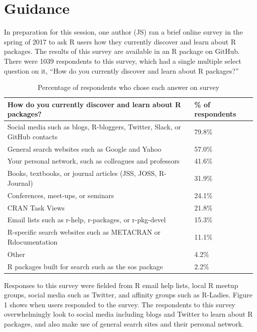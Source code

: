 \hypertarget{guidance}{%
\section{Guidance}\label{guidance}}

In preparation for this session, one author (JS) ran a brief online
survey in the spring of 2017 to ask R users how they currently discover
and learn about R packages. The results of this survey are available in
an R package  \citep{packagesurvey} on GitHub. There
were 1039 respondents to this survey, which had a single multiple select
question on it, ``How do you currently discover and learn about R
packages?''

\begin{Schunk}
\begin{table}

\caption{\label{tab:unnamed-chunk-2}Percentage of respondents who chose each answer on survey}
\centering
\begin{tabular}[t]{ll}
\toprule
How do you currently discover and learn about R packages? & \% of respondents\\
\midrule
Social media such as blogs, R-bloggers, Twitter, Slack, or GitHub contacts & 79.8\%\\
General search websites such as Google and Yahoo & 57.0\%\\
Your personal network, such as colleagues and professors & 41.6\%\\
Books, textbooks, or journal articles (JSS, JOSS, R-Journal) & 31.9\%\\
Conferences, meet-ups, or seminars & 24.1\%\\
\addlinespace
CRAN Task Views & 21.8\%\\
Email lists such as r-help, r-packages, or r-pkg-devel & 15.3\%\\
R-specific search websites such as METACRAN or Rdocumentation & 11.1\%\\
Other & 4.2\%\\
R packages built for search such as the sos package & 2.2\%\\
\bottomrule
\end{tabular}
\end{table}

\end{Schunk}

Responses to this survey were fielded from R email help lists, local R
meetup groups, social media such as Twitter, and affinity groups such as
R-Ladies. Figure 1 shows when users responded to the survey. The
respondents to this survey overwhelmingly look to social media including
blogs and Twitter to learn about R packages, and also make use of
general search sites and their personal network.

